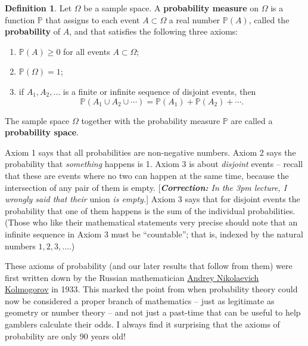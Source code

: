 \documentclass[
  a4paper,
]{book}
\providecommand{\tightlist}{%
  \setlength{\itemsep}{0pt}\setlength{\parskip}{0pt}}
\theoremstyle{definition}
\newtheorem{definition}{Definition}[chapter]
\theoremstyle{definition}
\theoremstyle{definition}
\theoremstyle{definition}
\theoremstyle{remark}
\begin{document}
\begin{definition}
\protect\hypertarget{def:axioms}{}\label{def:axioms}Let \(\Omega\) be a sample space. A \textbf{probability measure} on \(\Omega\) is a function \(\mathbb P\) that assigns to each event \(A \subset \Omega\) a real number \(\mathbb P(A)\), called the \textbf{probability} of \(A\), and that satisfies the following three axioms:

\begin{enumerate}
\def\labelenumi{\arabic{enumi}.}
\tightlist
\item
  \(\mathbb P(A) \geq 0\) for all events \(A \subset \Omega\);
\item
  \(\mathbb P(\Omega) = 1\);
\item
  if \(A_1, A_2, \dots\) is a finite or infinite sequence of disjoint events, then
  \[ \mathbb P(A_1 \cup A_2 \cup \cdots) = \mathbb P(A_1) + \mathbb P(A_2) + \cdots . \]
\end{enumerate}

The sample space \(\Omega\) together with the probability measure \(\mathbb P\) are called a \textbf{probability space}.
\end{definition}

Axiom 1 says that all probabilities are non-negative numbers. Axiom 2 says the probability that \emph{something} happens is 1. Axiom 3 is about \emph{disjoint} events -- recall that these are events where no two can happen at the same time, because the intersection of any pair of them is empty. {[}\emph{\textbf{Correction:} In the 3pm lecture, I wrongly said that their} union \emph{is empty.}{]} Axiom 3 says that for disjoint events the probability that one of them happens is the sum of the individual probabilities. (Those who like their mathematical statements very precise should note that an infinite sequence in Axiom 3 must be ``countable''; that is, indexed by the natural numbers \(1, 2, 3, \dots\).)

These axioms of probability (and our later results that follow from them) were first written down by the Russian mathematician \href{https://mathshistory.st-andrews.ac.uk/Biographies/Kolmogorov/}{Andrey Nikolaevich Kolmogorov} in 1933. This marked the point from when probability theory could now be considered a proper branch of mathematics -- just as legitimate as geometry or number theory -- and not just a past-time that can be useful to help gamblers calculate their odds. I always find it surprising that the axioms of probability are only 90 years old!
\end{document}
